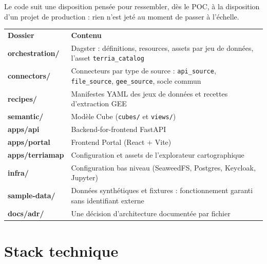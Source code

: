 \documentclass[11pt,a4paper]{article}
\newcommand{\tblhead}[1]{\headingfont\bfseries\footnotesize\color{white} #1}
\begin{document}
Le code suit une disposition pensée pour ressembler, dès le POC, à la disposition d'un projet de production : rien n'est jeté au moment de passer à l'échelle.

\begin{center}
\small
\begin{tabular}{@{} M{3.0cm} M{\dimexpr\textwidth-3.0cm-2\tabcolsep\relax} @{}}
\tblhead{Dossier} & \tblhead{Contenu} \\
 \ttfamily\bfseries\color{teal}\footnotesize orchestration/ & \rmfamily Dagster : définitions, resources, assets par jeu de données, l'asset \texttt{terria\_catalog} \\
\ttfamily\bfseries\color{teal}\footnotesize connectors/ & \rmfamily Connecteurs par type de source : \texttt{api\_source}, \texttt{file\_source}, \texttt{gee\_source}, socle commun \\
 \ttfamily\bfseries\color{teal}\footnotesize recipes/ & \rmfamily Manifestes YAML des jeux de données et recettes d'extraction GEE \\
\ttfamily\bfseries\color{teal}\footnotesize semantic/ & \rmfamily Modèle Cube (\texttt{cubes/} et \texttt{views/}) \\
 \ttfamily\bfseries\color{teal}\footnotesize apps/api & \rmfamily Backend-for-frontend FastAPI \\
\ttfamily\bfseries\color{teal}\footnotesize apps/portal & \rmfamily Frontend Portal (React + Vite) \\
 \ttfamily\bfseries\color{teal}\footnotesize apps/terriamap & \rmfamily Configuration et assets de l'explorateur cartographique \\
\ttfamily\bfseries\color{teal}\footnotesize infra/ & \rmfamily Configuration bas niveau (SeaweedFS, Postgres, Keycloak, Jupyter) \\
 \ttfamily\bfseries\color{teal}\footnotesize sample-data/ & \rmfamily Données synthétiques et fixtures : fonctionnement garanti sans identifiant externe \\
\ttfamily\bfseries\color{teal}\footnotesize docs/adr/ & \rmfamily Une décision d'architecture documentée par fichier \\
\end{tabular}
\end{center}

\section{Stack technique}
\end{document}
